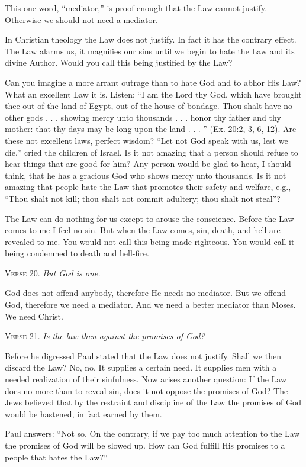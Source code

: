 This one word, “mediator,” is proof enough that the Law cannot justify. Otherwise we should not need a mediator.

In Christian theology the Law does not justify. In fact it has the contrary effect. The Law alarms us, it magnifies our sins until we begin to hate the Law and its divine Author. Would you call this being justified by the Law?

Can you imagine a more arrant outrage than to hate God and to abhor His Law? What an excellent Law it is. Listen: “I am the Lord thy God, which have brought thee out of the land of Egypt, out of the house of bondage. Thou shalt have no other gods . . . showing mercy unto thousands . . . honor thy father and thy mother: that thy days may be long upon the land . . . ” (Ex. 20:2, 3, 6, 12). Are these not excellent laws, perfect wisdom? “Let not God speak with us, lest we die,” cried the children of Israel. Is it not amazing that a person should refuse to hear things that are good for him? Any person would be glad to hear, I should think, that he has a gracious God who shows mercy unto thousands. Is it not amazing that people hate the Law that promotes their safety and welfare, e.g., “Thou shalt not kill; thou shalt not commit adultery; thou shalt not steal”?

The Law can do nothing for us except to arouse the conscience. Before the Law comes to me I feel no sin. But when the Law comes, sin, death, and hell are revealed to me. You would not call this being made righteous. You would call it being condemned to death and hell-fire.

\textsc{Verse} 20. \emph{But God is one.}

God does not offend anybody, therefore He needs no mediator. But we offend God, therefore we need a mediator. And we need a better mediator than Moses. We need Christ.

\textsc{Verse} 21. \emph{Is the law then against the promises of God?}

Before he digressed Paul stated that the Law does not justify. Shall we then discard the Law? No, no. It supplies a certain need. It supplies men with a needed realization of their sinfulness. Now arises another question: If the Law does no more than to reveal sin, does it not oppose the promises of God? The Jews believed that by the restraint and discipline of the Law the promises of God would be hastened, in fact earned by them.

Paul answers: “Not so. On the contrary, if we pay too much attention to the Law the promises of God will be slowed up. How can God fulfill His promises to a people that hates the Law?”


